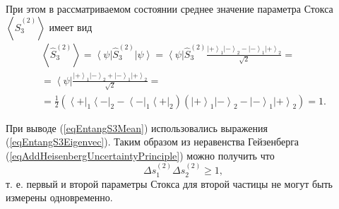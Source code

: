 При этом в рассматриваемом состоянии среднее значение параметра Стокса
$\left<\hat{S}_3^{(2)}\right>$ имеет вид
\begin{eqnarray}
  \left<\hat{S}_3^{(2)}\right> =
  \left<\psi\right|\hat{S}_3^{(2)}\left|\psi\right> =
  \left<\psi\right|\hat{S}_3^{(2)}\frac{
    \left| + \right>_1\left| - \right>_2 -
    \left| - \right>_1\left| + \right>_2
  }{\sqrt{2}} =
  \nonumber \\
  = \left<\psi\right|\frac{
    \left| + \right>_1\left| - \right>_2 +
    \left| - \right>_1\left| + \right>_2
  }{\sqrt{2}} =
  \nonumber \\
  = \frac{1}{2} \left(
  \left< + \right|_1\left< - \right|_2 -
  \left< - \right|_1\left< + \right|_2
  \right)
  \left(
  \left| + \right>_1\left| - \right>_2 -
  \left| - \right>_1\left| + \right>_2
  \right) = 1.
  \label{eqEntangS3Mean}
\end{eqnarray}

При выводе (\ref{eqEntangS3Mean}) использовались выражения
(\ref{eqEntangS3Eigenvec}). Таким образом из неравенства Гейзенберга
(\ref{eqAddHeisenbergUncertaintyPrinciple}) можно получить что
\[
\Delta s_1^{(2)} \Delta s_2^{(2)} \ge 1,
\]
т. е. первый и второй параметры Стокса для второй частицы не могут
быть измерены одновременно. 
